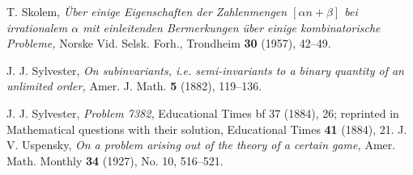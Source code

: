 \documentclass[12pt,letterpaper, reqno]{amsart}
\theoremstyle{definition}
\theoremstyle{remark}
\begin{document}
\begin{thebibliography}{99}
 T. Skolem,
 \emph{\"{U}ber einige Eigenschaften der Zahlenmengen $[\alpha n + \beta]$ bei irrationalem $\alpha$
 mit einleitenden Bermerkungen \"{u}ber einige kombinatorische Probleme,}
 Norske Vid. Selsk. Forh., Trondheim {\bf 30} (1957), 42--49.

J. J. Sylvester,
\emph{On subinvariants, i.e. semi-invariants to a binary quantity of an unlimited order,}
Amer. J. Math. {\bf 5} (1882), 119--136.

J. J. Sylvester,
\emph{Problem 7382,}
Educational Times {bf 37} (1884), 26;
reprinted in Mathematical questions with their solution,
Educational Times {\bf 41} (1884), 21. 
 J. V. Uspensky,
 \emph{On a problem arising out of the theory of a certain game,}
 Amer. Math. Monthly {\bf 34}  (1927),  No. 10, 516--521.

 \end{thebibliography}
\end{document}

